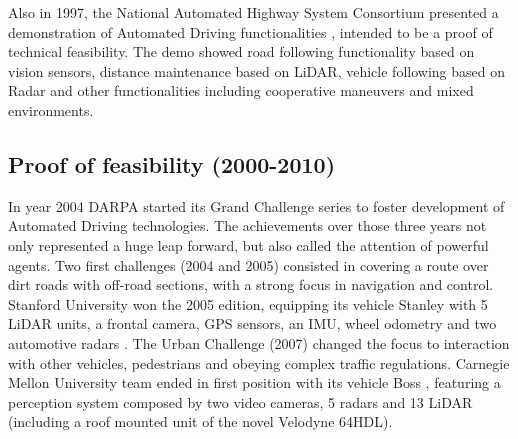 Also in 1997, the National Automated Highway System Consortium presented a 
demonstration of Automated Driving functionalities \cite{Thorpe1997}, intended 
to be a proof of technical feasibility. 
The demo showed road following functionality based on vision sensors, distance 
maintenance based on LiDAR, vehicle following based on Radar and other 
functionalities including cooperative maneuvers and mixed environments.



\subsection{Proof of feasibility (2000-2010)}

In year 2004 DARPA started its Grand Challenge series to foster development of
Automated Driving technologies. The achievements over those three years 
not only represented a huge leap forward, but also called the attention of
powerful agents.
Two first challenges (2004 and 2005) consisted in covering a route over dirt
roads with off-road sections, with a strong focus in navigation and control.
Stanford University won the 2005 edition, equipping its vehicle Stanley with
5 LiDAR units, a frontal camera, GPS sensors, an IMU, wheel odometry and two 
automotive radars \cite{Thrun2006}. 
The Urban Challenge (2007) changed the focus to interaction with other vehicles,
pedestrians and obeying complex traffic regulations. Carnegie Mellon University
team ended in first position with its vehicle Boss 
\cite{TartanRacing2005}
\cite{Urmson2007}, 
featuring a perception system composed by two video cameras, 5 radars and 13
LiDAR (including a roof mounted unit of the novel Velodyne 64HDL).


